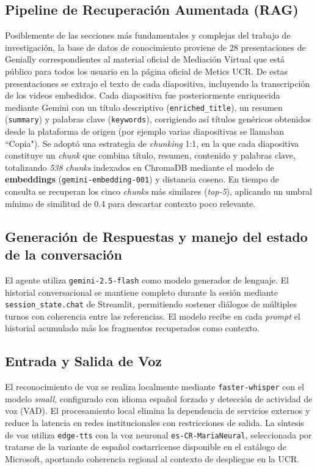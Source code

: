 \documentclass[conference]{IEEEtran}
\begin{document}
\subsection{Pipeline de Recuperación Aumentada (RAG)}
Posiblemente de las secciones más fundamentales y complejas del trabajo de investigación, la base de datos de conocimiento proviene de 28 presentaciones de Genially correspondientes al material oficial de Mediación Virtual que está público para todos los usuario en la página oficial de Metics UCR. De estas presentaciones se extrajo el texto de cada diapositiva, incluyendo la transcripción de los videos embedidos. Cada diapositiva fue posteriormente enriquecida mediante Gemini con un título descriptivo (\texttt{enriched\_title}), un resumen (\texttt{summary}) y palabras clave (\texttt{keywords}), corrigiendo así títulos genéricos obtenidos desde la plataforma de origen (por ejemplo varias diapositivas se llamaban ``Copia"). Se adoptó una estrategia de \emph{chunking} 1:1, en la que cada diapositiva constituye un \emph{chunk} que combina título, resumen, contenido y palabras clave, totalizando \emph{538} \emph{chunks} indexados en ChromaDB mediante el modelo de \textbf{embeddings} (\texttt{gemini-embedding-001}) y distancia coseno. En tiempo de consulta se recuperan los cinco \emph{chunks} más similares (\emph{top-5}), aplicando un umbral mínimo de similitud de 0.4 para descartar contexto poco relevante.



\subsection{Generación de Respuestas y manejo del estado de la conversación}
El agente utiliza \texttt{gemini-2.5-flash} como modelo generador de lenguaje. El historial conversacional se mantiene completo durante la sesión mediante \texttt{session\_state.chat} de Streamlit, permitiendo sostener diálogos de múltiples turnos con coherencia entre las referencias. El modelo recibe en cada \emph{prompt} el historial acumulado más los fragmentos recuperados como contexto.

\subsection{Entrada y Salida de Voz}
El reconocimiento de voz se realiza localmente mediante \texttt{faster-whisper} con el modelo \textit{small}, configurado con idioma español forzado y detección de actividad de voz (VAD). El procesamiento local elimina la dependencia de servicios externos y reduce la latencia en redes institucionales con restricciones de salida. La síntesis de voz utiliza \texttt{edge-tts} con la voz neuronal \texttt{es-CR-MariaNeural}, seleccionada por tratarse de la variante de español costarricense disponible en el catálogo de Microsoft, aportando coherencia regional al contexto de despliegue en la UCR.
\end{document}
